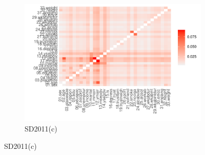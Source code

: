 \begin{figure}[ht]
  \begin{subfigure}{0.75\textwidth}
    \includegraphics[width=\linewidth]{../graphs/ctgan/ctgan_fidelity_twoway_sd2011_clean_small.pdf}
    \caption{SD2011(c)}
    \label{fig:ctgan_fidelity_two_way_subfig-c}
  \end{subfigure}

\end{figure}

